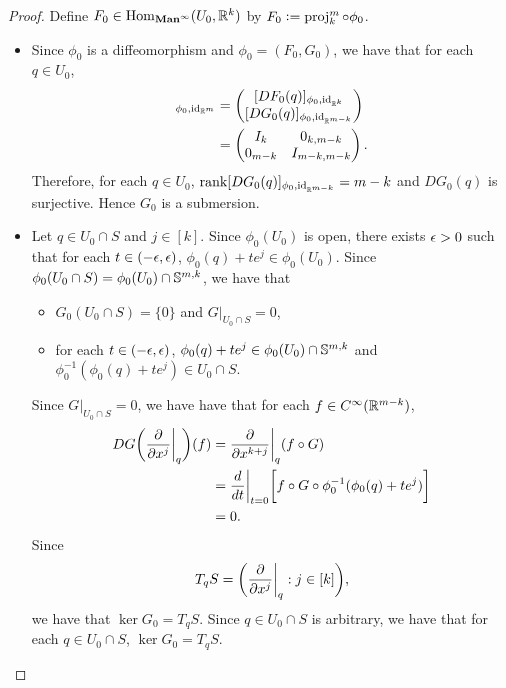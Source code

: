 \documentclass{book}
\begin{document}
	\begin{proof}
		Define $F_0 \in \Hom_{\bManinf}(U_0, \R^k)$ by $F_0 \defeq \prj^m_k \circ \phi_0$. 
		\begin{itemize}
			\item Since $\phi_0$ is a diffeomorphism and $\phi_0 = (F_0, G_0)$, we have that for each $q \in U_0$, 
			\begin{align*}
				[D\phi_0(q)]_{\phi_0, \id_{\R^m}} 
				& = 
				\begin{pmatrix}
					[DF_0(q)]_{\phi_0, \id_{\R^k}} \\
					[DG_0(q)]_{\phi_0, \id_{\R^{m-k}}}
				\end{pmatrix} \\
				& = 
				\begin{pmatrix}
					I_{k} & 0_{k, m - k} \\
					0_{m-k} & I_{m-k, m-k}
				\end{pmatrix}.
			\end{align*} 
			Therefore, for each $q \in U_0$, $\rnk [DG_0(q)]_{\phi_0, \id_{\R^{m-k}}} = m-k$ and $DG_0(q)$ is surjective. Hence $G_0$ is a submersion. 
			\item Let $q \in U_0 \cap S$ and $j \in [k]$. Since $\phi_0(U_0)$ is open, there exists $\ep >0$ such that for each $t \in (-\ep, \ep)$, $\phi_0(q) + t e^j \in \phi_0(U_0)$. Since $\phi_0(U_0 \cap S) = \phi_0(U_0) \cap \S^{m, k}$, we have that 
			\begin{itemize}
				\item $G_0(U_0 \cap S) = \{0\}$ and $G|_{U_0 \cap S} = 0$,
				\item for each $t \in (-\ep, \ep)$, $\phi_0(q) + t e^j \in \phi_0(U_0) \cap \S^{m,k}$ and $\phi_0^{-1}(\phi_0(q) + t e^j) \in U_0 \cap S$. 
			\end{itemize}
			Since $G|_{U_0 \cap S} = 0$, we have have that for each $f \in C^{\infty}(\R^{m-k})$,
			\begin{align*}
				DG \bigg( \frac{\p}{\p x^j} \bigg|_q \bigg)(f)
				& = \frac{\p}{\p x^{k+j}} \bigg|_q (f \circ G) \\
				& = \frac{d}{d t} \bigg|_{t = 0} \bigg[f \circ G \circ \phi_0^{-1}(\phi_0(q) + t e^j) \bigg] \\
				& = 0.
			\end{align*}
			Since 
			$$T_q S = \bigg(\frac{\p}{\p x^j} \bigg|_q : j \in [k] \bigg),$$
			we have that $\ker G_0 = T_q S$. Since $q \in U_0 \cap S$ is arbitrary, we have that for each $q \in U_0 \cap S$, $\ker G_0 = T_qS$.
		\end{itemize}
	\end{proof}
\end{document}
